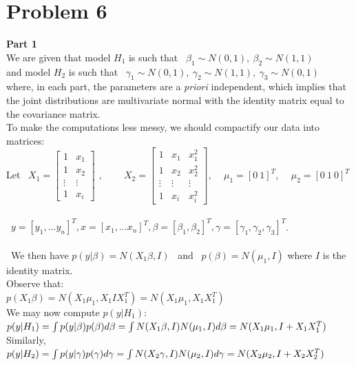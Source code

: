 \documentclass[10pt,a4paper]{article}
\begin{document}
\section{Problem 6}
\textbf{Part 1} \\
We are given that model $H_1$ is such that \ $\beta_1 \sim N(0,1), \ \beta_2 \sim N(1,1) $\\
and model $H_2$ is such that \ $\gamma_1 \sim N(0,1), \ \gamma_2 \sim N(1,1), \ \gamma_3 \sim N(0,1) $\\
where, in each part, the parameters are a \textit{priori} independent, which implies that the joint distributions are multivariate normal with the identity matrix equal to the covariance matrix. \\
To make the computations less messy, we should compactify our data into matrices: \\
Let \ $X_1=\begin{bmatrix}
1&x_1\\
1&x_2\\
\vdots&\vdots\\
1&x_i
\end{bmatrix}$ , \ \ \ \ 
$X_2=\begin{bmatrix}
1&x_1&x_1^2\\
1&x_2&x_2^2\\
\vdots&\vdots&\vdots\\
1&x_i&x_i^2
\end{bmatrix}$, \ \ $\mu_1=[0 \ 1]^T$, \ \ $\mu_2=[0 \ 1 \ 0]^T$ \\
\\\
$y=[y_1, ...y_n]^T, x=[x_1,...x_n]^T, \beta=[\beta_1,\beta_2]^T, \gamma=[\gamma_1,\gamma_2,\gamma_3]^T $. \\
\\\
We then have $p(y|\beta)=N(X_1\beta,I)$ \ and \ $p(\beta)=N(\mu_1,I)$ where $I$ is the identity matrix. \\
Observe that:\\
$p(X_1\beta)=N(X_1\mu_1,X_1IX_1^T)=N(X_1\mu_1,X_1X_1^T)$\\
We may now compute $p(y|H_1)$:\\
$p(y|H_1)=\int p(y|\beta)p(\beta)d\beta= \int N(X_1\beta,I)N(\mu_1,I)d\beta\\
=N(X_1\mu_1,I+X_1 X_1^T)$\\
Similarly,\\
$p(y|H_2)=\int p(y|\gamma)p(\gamma)d\gamma= \int N(X_2\gamma,I)N(\mu_2,I)d\gamma\\
=N(X_2\mu_2,I+X_2 X_2^T)$\\
\end{document}
